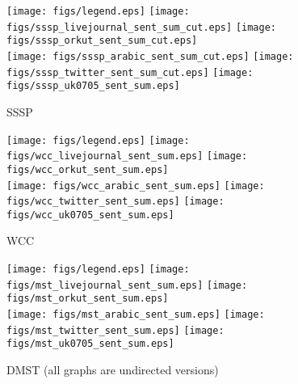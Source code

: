 \documentclass{article}
\newcommand{\bline}[1][1]{\vspace{#1\baselineskip}}
\begin{document}
\begin{figure}[!h]
  \bline[3.5]
  \centering
  \texttt{[image: figs/legend.eps]}\hspace{3em}%
  \texttt{[image: figs/sssp\_livejournal\_sent\_sum\_cut.eps]}\hspace{1em}%
  \texttt{[image: figs/sssp\_orkut\_sent\_sum\_cut.eps]}\\
  \texttt{[image: figs/sssp\_arabic\_sent\_sum\_cut.eps]}\hspace{1em}%
  \texttt{[image: figs/sssp\_twitter\_sent\_sum\_cut.eps]}\hspace{1em}%
  \texttt{[image: figs/sssp\_uk0705\_sent\_sum.eps]}
  \caption{SSSP}
\end{figure}

\begin{figure}[!h]
  \bline[3.5]
  \centering
  \texttt{[image: figs/legend.eps]}\hspace{3em}%
  \texttt{[image: figs/wcc\_livejournal\_sent\_sum.eps]}\hspace{1em}%
  \texttt{[image: figs/wcc\_orkut\_sent\_sum.eps]}\\
  \texttt{[image: figs/wcc\_arabic\_sent\_sum.eps]}\hspace{1em}%
  \texttt{[image: figs/wcc\_twitter\_sent\_sum.eps]}\hspace{1em}%
  \texttt{[image: figs/wcc\_uk0705\_sent\_sum.eps]}
  \caption{WCC}
\end{figure}

\begin{figure}[!h]
  \bline[3.5]
  \centering
  \texttt{[image: figs/legend.eps]}\hspace{3em}%
  \texttt{[image: figs/mst\_livejournal\_sent\_sum.eps]}\hspace{1em}%
  \texttt{[image: figs/mst\_orkut\_sent\_sum.eps]}\\
  \texttt{[image: figs/mst\_arabic\_sent\_sum.eps]}\hspace{1em}%
  \texttt{[image: figs/mst\_twitter\_sent\_sum.eps]}\hspace{1em}%
  \texttt{[image: figs/mst\_uk0705\_sent\_sum.eps]}
  \caption{DMST (all graphs are undirected versions)}
\end{figure}
\end{document}
